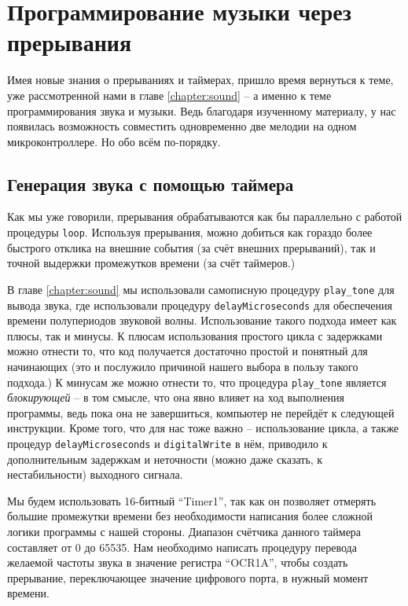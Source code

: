 \documentclass[../sparc.tex]{subfiles}
\begin{document}
\section{Программирование музыки через прерывания}

Имея новые знания о прерываниях и таймерах, пришло время вернуться к теме, уже
рассмотренной нами в главе \ref{chapter:sound} -- а именно к теме
программирования звука и музыки.  Ведь благодаря изученному материалу, у нас
появилась возможность совместить одновременно две мелодии на одном
микроконтроллере.  Но обо всём по-порядку.

\subsection{Генерация звука с помощью таймера}

Как мы уже говорили, прерывания обрабатываются как бы параллельно с работой
процедуры \texttt{loop}.  Используя прерывания, можно добиться как
гораздо более быстрого отклика на внешние события (за счёт внешних прерываний),
так и точной выдержки промежутков времени (за счёт таймеров.)

В главе \ref{chapter:sound} мы использовали самописную процедуру
\texttt{play_tone} для вывода звука, где использовали процедуру
\texttt{delayMicroseconds} для обеспечения времени полупериодов
звуковой волны.  Использование такого подхода имеет как плюсы, так и минусы.  К
плюсам использования простого цикла с задержками можно отнести то, что код
получается достаточно простой и понятный для начинающих (это и послужило
причиной нашего выбора в пользу такого подхода.)  К минусам же можно отнести то,
что процедура \texttt{play_tone} является \emph{блокирующей} -- в том
смысле, что она явно влияет на ход выполнения программы, ведь пока она не
завершиться, компьютер не перейдёт к следующей инструкции.  Кроме того, что для
нас тоже важно -- использование цикла, а также процедур
\texttt{delayMicroseconds} и \texttt{digitalWrite} в нём,
приводило к дополнительным задержкам и неточности (можно даже сказать, к
нестабильности) выходного сигнала.

Мы будем использовать 16-битный ``Timer1'', так как он позволяет отмерять
большие промежутки времени без необходимости написания более сложной логики
программы с нашей стороны.  Диапазон счётчика данного таймера составляет от 0 до
65535.  Нам необходимо написать процедуру перевода желаемой частоты звука в
значение регистра ``OCR1A'', чтобы создать прерывание, переключающее значение
цифрового порта, в нужный момент времени.
\end{document}
